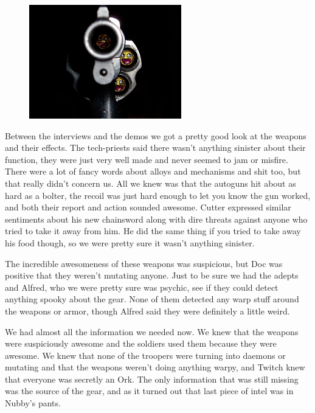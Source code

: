 \begin{figure}
	\begin{center}
		\includegraphics[width=\figwidth]{pics/4/13.png}
	\end{center}
\end{figure}
Between the interviews and the demos we got a pretty good look at the weapons and their effects. 
The tech-priests said there wasn't anything sinister about their function, they were just very well made and never seemed to jam or misfire. 
There were a lot of fancy words about alloys and mechanisms and shit too, but that really didn't concern us. 
All we knew was that the autoguns hit about as hard as a bolter, the recoil was just hard enough to let you know the gun worked, and both their report and action sounded awesome. 
Cutter expressed similar sentiments about his new chainsword along with dire threats against anyone who tried to take it away from him. 
He did the same thing if you tried to take away his food though, so we were pretty sure it wasn't anything sinister.

The incredible awesomeness of these weapons was suspicious, but Doc was positive that they weren't mutating anyone. 
Just to be sure we had the adepts and Alfred, who we were pretty sure was psychic, see if they could detect anything spooky about the gear. 
None of them detected any warp stuff around the weapons or armor, though Alfred said they were definitely a little weird. 

We had almost all the information we needed now. We knew that the weapons were suspiciously awesome and the soldiers used them because they were awesome. 
We knew that none of the troopers were turning into daemons or mutating and that the weapons weren't doing anything warpy, and Twitch knew that everyone was secretly an Ork. 
The only information that was still missing was the source of the gear, and as it turned out that last piece of intel was in Nubby's pants.

